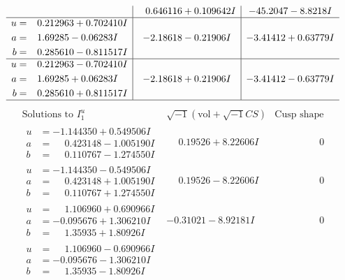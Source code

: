 \documentclass[1p]{elsarticle_modified}
\theoremstyle{definition}
\newcommand{\I}{\sqrt{-1}}
\begin{document}
$$\begin{array}{c|c|c}
 & \phantom{-}0.646116 + 0.109642 I & -45.2047 - 8.8218 I \\ \hline\begin{aligned}
u &= \phantom{-}0.212963 + 0.702410 I \\
a &= \phantom{-}1.69285 - 0.06283 I \\
b &= \phantom{-}0.285610 - 0.811517 I\end{aligned}
 & -2.18618 - 0.21906 I & -3.41412 + 0.63779 I \\ \hline\begin{aligned}
u &= \phantom{-}0.212963 - 0.702410 I \\
a &= \phantom{-}1.69285 + 0.06283 I \\
b &= \phantom{-}0.285610 + 0.811517 I\end{aligned}
 & -2.18618 + 0.21906 I & -3.41412 - 0.63779 I\\
 \hline 
 \end{array}$$\newpage$$\begin{array}{c|c|c}  
\text{Solutions to }I^u_{1}& \I (\text{vol} + \sqrt{-1}CS) & \text{Cusp shape}\\
 \hline 
\begin{aligned}
u &= -1.144350 + 0.549506 I \\
a &= \phantom{-}0.423148 - 1.005190 I \\
b &= \phantom{-}0.110767 - 1.274550 I\end{aligned}
 & \phantom{-}0.19526 + 8.22606 I & \phantom{-0.000000 } 0 \\ \hline\begin{aligned}
u &= -1.144350 - 0.549506 I \\
a &= \phantom{-}0.423148 + 1.005190 I \\
b &= \phantom{-}0.110767 + 1.274550 I\end{aligned}
 & \phantom{-}0.19526 - 8.22606 I & \phantom{-0.000000 } 0 \\ \hline\begin{aligned}
u &= \phantom{-}1.106960 + 0.690966 I \\
a &= -0.095676 + 1.306210 I \\
b &= \phantom{-}1.35935 + 1.80926 I\end{aligned}
 & -0.31021 - 8.92181 I & \phantom{-0.000000 } 0 \\ \hline\begin{aligned}
u &= \phantom{-}1.106960 - 0.690966 I \\
a &= -0.095676 - 1.306210 I \\
b &= \phantom{-}1.35935 - 1.80926 I\end{aligned}

\end{array}$$
\end{document}
